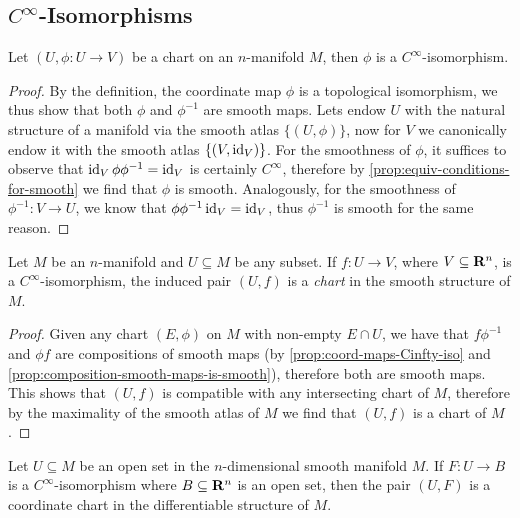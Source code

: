 \subsection{\texorpdfstring{\(C^{\infty}\)}{smooth}-Isomorphisms}

\begin{proposition}
\label{prop:coord-maps-Cinfty-iso}
Let \((U, \phi: U \to V)\) be a chart on an \(n\)-manifold \(M\), then \(\phi\)
is a \(C^\infty\)-isomorphism.
\end{proposition}

\begin{proof}
By the definition, the coordinate map \(\phi\) is a topological isomorphism, we
thus show that both \(\phi\) and \(\phi^{-1}\) are smooth maps. Lets endow \(U\)
with the natural structure of a manifold via the smooth atlas \(\{(U, \phi)\}\),
now for \(V\) we canonically endow it with the smooth atlas
\(\{(V, \operatorname{id}_{V})\}\). For the smoothness of \(\phi\), it suffices to observe
that \(\operatorname{id}_V \phi \phi^{-1} = \operatorname{id}_V\) is certainly \(C^{\infty}\), therefore by
\cref{prop:equiv-conditions-for-smooth} we find that \(\phi\) is
smooth. Analogously, for the smoothness of \(\phi^{-1}: V \to U\), we know that
\(\phi \phi^{-1} \operatorname{id}_V = \operatorname{id}_V\), thus \(\phi^{-1}\) is smooth for the same
reason.
\end{proof}

\begin{proposition}
\label{prop:smooth-iso-is-charts}
Let \(M\) be an \(n\)-manifold and \(U \subseteq M\) be any subset. If
\(f: U \to V\), where \(V \subseteq \mathbf{R}^n\), is a \(C^{\infty}\)-isomorphism, the
induced pair \((U, f)\) is a \emph{chart} in the smooth structure of \(M\).
\end{proposition}

\begin{proof}
Given any chart \((E, \phi)\) on \(M\) with non-empty \(E \cap U\), we have that
\(f \phi^{-1}\) and \(\phi f\) are compositions of smooth maps (by
\cref{prop:coord-maps-Cinfty-iso} and
\cref{prop:composition-smooth-maps-is-smooth}), therefore both are smooth
maps. This shows that \((U, f)\) is compatible with any intersecting chart of
\(M\), therefore by the maximality of the smooth atlas of \(M\) we find that
\((U, f)\) is a chart of \(M\).
\end{proof}

\begin{proposition}
\label{prop:smooth-maps-are-coordinate-charts}
Let \(U \subseteq M\) be an open set in the \(n\)-dimensional smooth manifold
\(M\). If \(F: U \to B\) is a \(C^{\infty}\)-isomorphism where
\(B \subseteq \mathbf{R}^n\) is an open set, then the pair \((U, F)\) is a coordinate
chart in the differentiable structure of \(M\).
\end{proposition}

